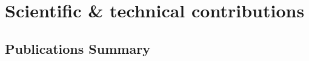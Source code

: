 \documentclass[11pt,a4paper]{article}
\newcommand{\mzc}[1]{}
\begin{document}





\newpage

\section*{Scientific \& technical contributions}

\subsection*{Publications Summary}


\def\signhot{{\color{gray!30!black}\faHotjar}}
\def\signcited{\faTrophy}
\def\signsenior{\faHatWizard}
\def\signcode{} %
\def\signidea{\faLightbulb[regular]}
\def\signlead{\faFlag[regular]}
\def\signalpha{\faSortAlphaDown}
\def\signfeatured{\faStar[regular]}
\end{document}
